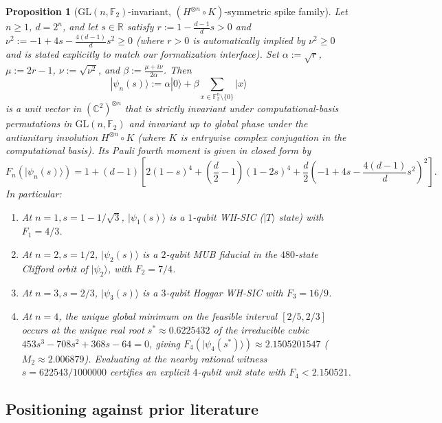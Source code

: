 \documentclass[11pt,a4paper]{article}
\theoremstyle{plain}
\newtheorem{mainproposition}{Proposition}
\theoremstyle{definition}
\theoremstyle{remark}
\newcommand{\C}{\mathbb{C}}
\newcommand{\R}{\mathbb{R}}
\newcommand{\F}{\mathbb{F}}
\newcommand{\GL}{\mathrm{GL}}
\newcommand{\ket}[1]{|#1\rangle}
\numberwithin{equation}{section}
\begin{document}
\begin{mainproposition}[$\GL(n,\F_2)$-invariant, $(H^{\otimes n}\circ K)$-symmetric spike family]\label{prop:spike}
Let $n \ge 1$, $d = 2^n$, and let $s \in \R$ satisfy $r := 1 - \frac{d-1}{d}s > 0$ and $\nu^2 := -1 + 4s - \frac{4(d-1)}{d}s^2 \ge 0$ (where $r > 0$ is automatically implied by $\nu^2 \ge 0$ and is stated explicitly to match our formalization interface). Set $\alpha := \sqrt{r}$, $\mu := 2r - 1$, $\nu := \sqrt{\nu^2}$, and $\beta := \frac{\mu + i\nu}{2\alpha}$. Then
\begin{equation}\label{eq:spike-def}
  \ket{\psi_n(s)} := \alpha\ket{0} + \beta \sum_{x \in \F_2^n \setminus \{0\}} \ket{x}
\end{equation}
is a unit vector in $(\C^2)^{\otimes n}$ that is strictly invariant under computational-basis permutations in $\GL(n,\F_2)$ and invariant up to global phase under the antiunitary involution $H^{\otimes n} \circ K$ (where $K$ is entrywise complex conjugation in the computational basis). Its Pauli fourth moment is given in closed form by
\begin{equation}\label{eq:spike-poly}
  F_n(\ket{\psi_n(s)}) = 1 + (d - 1)\!\left[2(1-s)^4 + \left(\frac{d}{2} - 1\right)(1 - 2s)^4 + \frac{d}{2}\left(-1 + 4s - \frac{4(d-1)}{d}s^2\right)^2\right].
\end{equation}
In particular:
\begin{enumerate}[label=(\alph*),leftmargin=2em]
  \item At $n = 1, s = 1 - 1/\sqrt{3}$, $\ket{\psi_1(s)}$ is a $1$-qubit WH-SIC ($\ket{T}$ state) with $F_1 = 4/3$.
  \item At $n = 2, s = 1/2$, $\ket{\psi_2(s)}$ is a $2$-qubit MUB fiducial in the $480$-state Clifford orbit of $\ket{\psi_2}$, with $F_2 = 7/4$.
  \item At $n = 3, s = 2/3$, $\ket{\psi_3(s)}$ is a $3$-qubit Hoggar WH-SIC with $F_3 = 16/9$.
  \item At $n = 4$, the unique global minimum on the feasible interval $[2/5, 2/3]$ occurs at the unique real root $s^* \approx 0.6225432$ of the irreducible cubic $453 s^3 - 708 s^2 + 368 s - 64 = 0$, giving $F_4(\ket{\psi_4(s^*)}) \approx 2.1505201547$ ($M_2 \approx 2.006879$). Evaluating at the nearby rational witness $s = 622543/1000000$ certifies an explicit $4$-qubit unit state with $F_4 < 2.150521$.
\end{enumerate}
\end{mainproposition}

\subsection{Positioning against prior literature}
\end{document}
